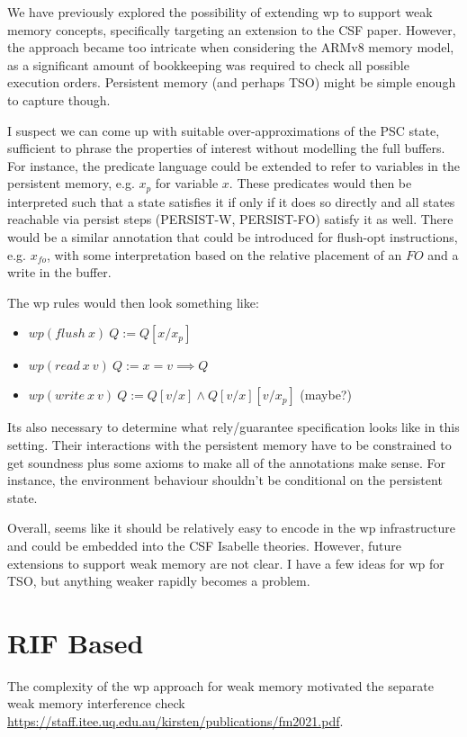 We have previously explored the possibility of extending wp to support weak memory concepts, specifically targeting an extension to the CSF paper. However, the approach became too intricate when considering the ARMv8 memory model, as a significant amount of bookkeeping was required to check all possible execution orders. Persistent memory (and perhaps TSO) might be simple enough to capture though.

I suspect we can come up with suitable over-approximations of the PSC state, sufficient to phrase the properties of interest without modelling the full buffers. For instance, the predicate language could be extended to refer to variables in the persistent memory, e.g. $x_p$ for variable $x$. These predicates would then be interpreted such that a state satisfies it if only if it does so directly and all states reachable via persist steps (PERSIST-W, PERSIST-FO) satisfy it as well. There would be a similar annotation that could be introduced for flush-opt instructions, e.g. $x_{fo}$, with some interpretation based on the relative placement of an $FO$ and a write in the buffer.

The wp rules would then look something like:

\begin{itemize}
\item $wp(flush~x)~Q := Q[x/x_p]$
\item $wp(read~x~v)~Q := x = v \implies Q$ 
\item $wp(write~x~v)~Q := Q[v/x] \land Q[v/x][v/x_p]$ (maybe?)
\end{itemize}
Its also necessary to determine what rely/guarantee specification looks like in this setting. Their interactions with the persistent memory have to be constrained to get soundness plus some axioms to make all of the annotations make sense. For instance, the environment behaviour shouldn't be conditional on the persistent state.

Overall, seems like it should be relatively easy to encode in the wp infrastructure and could be embedded into the CSF Isabelle theories. However, future extensions to support weak memory are not clear. I have a few ideas for wp for TSO, but anything weaker rapidly becomes a problem.

\section{RIF Based}

The complexity of the wp approach for weak memory motivated the
separate weak memory interference check
\url{https://staff.itee.uq.edu.au/kirsten/publications/fm2021.pdf}.

